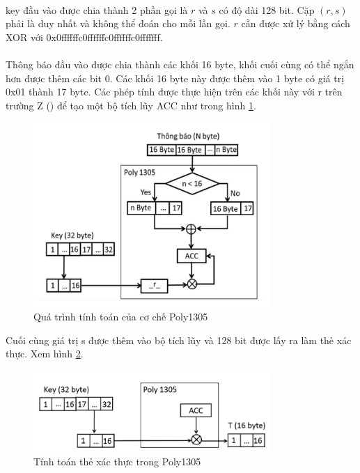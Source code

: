 \paragraph{}
\Gls{key} đầu vào được chia thành 2 phần gọi là $r$ và $s$ có độ dài 128 bit. Cặp $(r, s)$ phải là duy nhất và không thể đoán cho mỗi lần gọi. $r$ cần được xử lý bằng cách XOR với 0x0ffffffc0ffffffc0ffffffc0fffffff. 

\paragraph{}
Thông báo đầu vào được chia thành các khối 16 byte, khối cuối cùng có thể ngắn hơn được thêm các bit 0. Các khối 16 byte này được thêm vào 1 byte có giá trị 0x01 thành 17 byte. Các phép tính được thực hiện trên các khối này với r trên trường Z () để tạo một bộ tích lũy ACC như trong hình \ref{fig:polycalc}.

\begin{figure}[h]
	\centering
	\includegraphics[width=0.8\textwidth]{images/poly1305.png}
	\caption{Quá trình tính toán của cơ chế Poly1305}
	\label{fig:polycalc}
\end{figure}

Cuối cùng giá trị s được thêm vào bộ tích lũy và 128 bit được lấy ra làm thẻ xác thực. Xem hình \ref{fig:polytag}.

\begin{figure}[h]
	\centering
	\includegraphics[width=0.8\textwidth]{images/poly.png}
	\caption{Tính toán thẻ xác thực trong Poly1305}
	\label{fig:polytag}
\end{figure}

